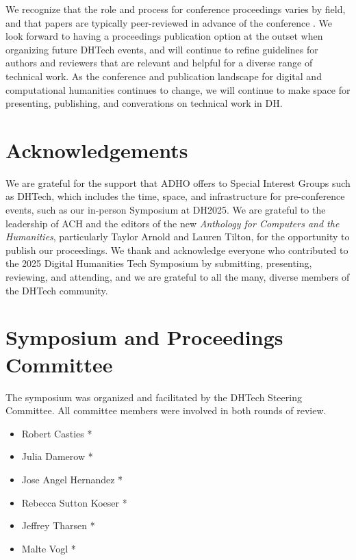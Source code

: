 \documentclass[final]{anthology-ch} %
\begin{document}
We recognize that the role and process for conference proceedings varies by field, and that papers are typically peer-reviewed in advance of the conference \cite{10.63744@rWDzgqfDLYNm}. We look forward to having a proceedings publication option at the outset when organizing future DHTech events, and will continue to refine guidelines for authors and reviewers that are relevant and helpful for a diverse range of technical work.  As the conference and publication landscape for digital and computational humanities continues to change, we will continue to make space for presenting, publishing, and converations on technical work in DH. 

\section*{Acknowledgements}

We are grateful for the support that ADHO offers to Special Interest Groups such as DHTech, which includes the time, space, and infrastructure for pre-conference events, such as our in-person Symposium at DH2025. We are grateful to the leadership of ACH and the editors of the new \textit{Anthology for Computers and the Humanities}, particularly Taylor Arnold and Lauren Tilton, for the opportunity to publish our proceedings. We thank and acknowledge everyone who contributed to the 2025 Digital Humanities Tech Symposium by submitting, presenting, reviewing, and attending, and we are grateful to all the many, diverse members of the DHTech community.

\printbibliography

\appendix
\section*{Symposium and Proceedings Committee}

The symposium was organized and facilitated by the DHTech Steering Committee.  All committee members were involved in both rounds of review.

\begin{itemize}
    \item Robert Casties  *\textbf{\textdagger}\textbf{\textdaggerdbl} 
    \item Julia Damerow  *\textbf{\textdagger}\textbf{\textdaggerdbl}
    \item Jose Angel Hernandez  *\textbf{\textdagger}\textbf{\textdaggerdbl} 
    \item Rebecca Sutton Koeser *\textbf{\textdagger}\textbf{\textdaggerdbl} 
    \item Jeffrey Tharsen *\textbf{\textdagger}
    \item Malte Vogl *\textbf{\textdagger}
\end{itemize}
\end{document}

